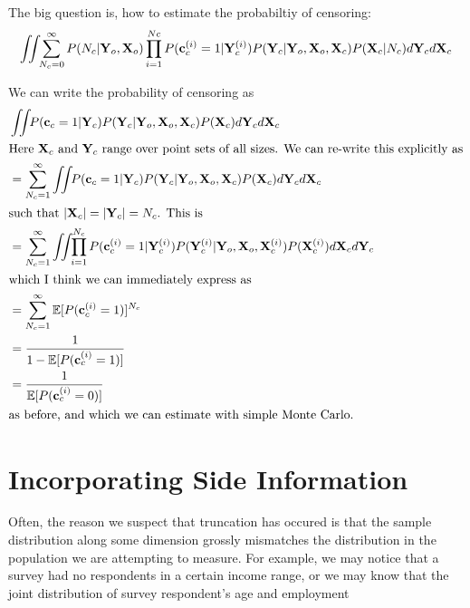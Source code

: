 \documentclass{article}
\begin{document}
The big question is, how to estimate the probabiltiy of censoring:
%
\begin{align}
\int \!\!\! \int \!\! \sum_{N_c = 0}^\infty P(N_c | \mathbf{Y}_o, \mathbf{X}_o ) \prod_{i=1}^{Nc} P( {\bf{c}}_c^{(i)} = 1 | \mathbf{Y}_c^{(i)} ) P( \mathbf{Y}_c | \mathbf{Y}_o, \mathbf{X}_o, \mathbf{X}_c) P(\mathbf{X}_c | N_c ) d\mathbf{Y}_c d\mathbf{X}_c
\label{eqn:approx-prob-censoring}
\end{align}

%

We can write the probability of censoring as
\begin{align*}
  & \intlatent P(\vc_c = 1 | \vY_c) P(\vY_c | \vY_o, \vX_o, \vX_c)
  P(\vX_c) d\vY_c d\vX_c \\
  \intertext{Here $\vX_c$ and $\vY_c$ range over point sets of all sizes. We can
  re-write this explicitly as}
  &= \sum_{N_c = 1}^\infty \intlatent P(\vc_c = 1 | \vY_c) P(\vY_c | \vY_o, \vX_o, \vX_c)
  P(\vX_c) d\vY_c d\vX_c \\
  \intertext{such that $|\vX_c| = |\vY_c| = N_c$. This is}
  &= \sum_{N_c = 1}^\infty \intlatent \prod_{i=1}^{N_c} P(\vc_c^{(i)} = 1 |
  \vY_c^{(i)}) P(\vY_c^{(i)} | \vY_o, \vX_o, \vX_c^{(i)}) P(\vX_c^{(i)}) d\vX_c d\vY_c \\
  \intertext{which I think we can immediately express as}
  &= \sum_{N_c = 1}^\infty \expect [P(\vc_c^{(i)} = 1)]^{N_c} \\
  &= \frac{1}{1 - \expect[P(\vc_c^{(i)} = 1)]} \\
  &= \frac{1}{\expect[P(\vc_c^{(i)} = 0)]} \\
  \intertext{as before, and which we can estimate with simple Monte Carlo.}
\end{align*}

\section{Incorporating Side Information}

Often, the reason we suspect that truncation has occured is that the sample distribution along some dimension grossly mismatches the distribution in the population we are attempting to measure.  For example, we may notice that a survey had no respondents in a certain income range, or we may know that the joint distribution of survey respondent's age and employment
\end{document}
